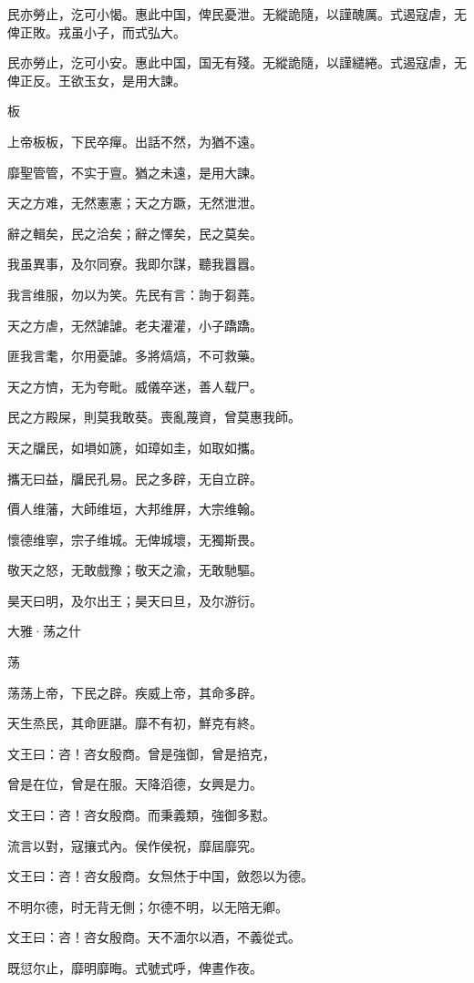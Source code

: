 民亦勞止，汔可小愒。惠此中国，俾民憂泄。无縱詭隨，以謹醜厲。式遏寇虐，无俾正敗。戎虽小子，而式弘大。

民亦勞止，汔可小安。惠此中国，国无有殘。无縱詭隨，以謹繾綣。式遏寇虐，无俾正反。王欲玉女，是用大諫。

板

上帝板板，下民卒癉。出話不然，为猶不遠。

靡聖管管，不实于亶。猶之未遠，是用大諫。

天之方难，无然憲憲；天之方蹶，无然泄泄。

辭之輯矣，民之洽矣；辭之懌矣，民之莫矣。

我虽異事，及尔同寮。我即尔謀，聽我囂囂。

我言维服，勿以为笑。先民有言：詢于芻蕘。

天之方虐，无然謔謔。老夫灌灌，小子蹻蹻。

匪我言耄，尔用憂謔。多將熇熇，不可救藥。

天之方懠，无为夸毗。威儀卒迷，善人载尸。

民之方殿屎，則莫我敢葵。喪亂蔑資，曾莫惠我師。

天之牖民，如塤如篪，如璋如圭，如取如攜。

攜无曰益，牖民孔易。民之多辟，无自立辟。

價人维藩，大師维垣，大邦维屏，大宗维翰。

懷德维寧，宗子维城。无俾城壞，无獨斯畏。

敬天之怒，无敢戲豫；敬天之渝，无敢馳驅。

昊天曰明，及尔出王；昊天曰旦，及尔游衍。




大雅·荡之什


荡

荡荡上帝，下民之辟。疾威上帝，其命多辟。

天生烝民，其命匪諶。靡不有初，鮮克有終。

文王曰：咨！咨女殷商。曾是強御，曾是掊克，

曾是在位，曾是在服。天降滔德，女興是力。

文王曰：咨！咨女殷商。而秉義類，強御多懟。

流言以對，寇攘式內。侯作侯祝，靡屆靡究。

文王曰：咨！咨女殷商。女炰烋于中国，斂怨以为德。

不明尔德，时无背无側；尔德不明，以无陪无卿。

文王曰：咨！咨女殷商。天不湎尔以酒，不義從式。

既愆尔止，靡明靡晦。式號式呼，俾晝作夜。

